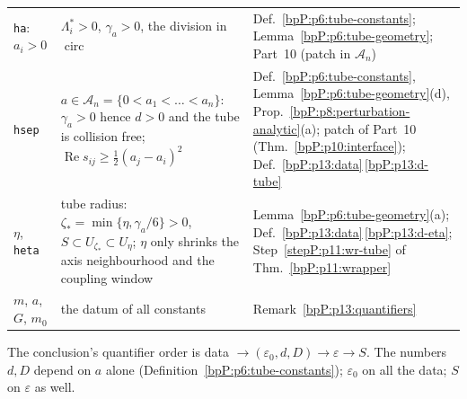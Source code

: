 \begin{remark}
\begin{center}
\begin{tabular}{@{}p{2.1cm}p{5.2cm}p{4.6cm}@{}}
\texttt{ha}: $a_i>0$ & $\Lambda_i^*>0$, $\gamma_a>0$, the division in $\operatorname{circ}$ & Def.~\ref{bpP:p6:tube-constants}; Lemma~\ref{bpP:p6:tube-geometry}; Part~10 (patch in $\mathcal A_n$)\\
\texttt{hsep} & $a\in\mathcal A_n=\{0<a_1<\dots<a_n\}$: $\gamma_a>0$ hence $d>0$ and the tube is collision free; $\operatorname{Re}s_{ij}\ge\frac12(a_j-a_i)^2$ & Def.~\ref{bpP:p6:tube-constants}, Lemma~\ref{bpP:p6:tube-geometry}(d), Prop.~\ref{bpP:p8:perturbation-analytic}(a); patch of Part~10 (Thm.~\ref{bpP:p10:interface}); Def.~\ref{bpP:p13:data}\,\ref{bpP:p13:d-tube}\\
$\eta$, \texttt{heta} & tube radius: $\zeta_*=\min\{\eta,\gamma_a/6\}>0$, $S\subset U_{\zeta_*}\subset U_\eta$; $\eta$ only shrinks the axis neighbourhood and the coupling window & Lemma~\ref{bpP:p6:tube-geometry}(a); Def.~\ref{bpP:p13:data}\,\ref{bpP:p13:d-eta}; Step~\ref{stepP:p11:wr-tube} of Thm.~\ref{bpP:p11:wrapper}\\
$m$, $a$, $G$, $m_0$ & the datum of all constants & Remark~\ref{bpP:p13:quantifiers}\\
\hline
\end{tabular}
\end{center}
The conclusion's quantifier order is data $\to(\varepsilon_0,d,D)\to\varepsilon\to S$. The numbers $d,D$ depend on $a$ alone (Definition~\ref{bpP:p6:tube-constants}); $\varepsilon_0$ on all the data; $S$ on $\varepsilon$ as well.
\end{remark}

